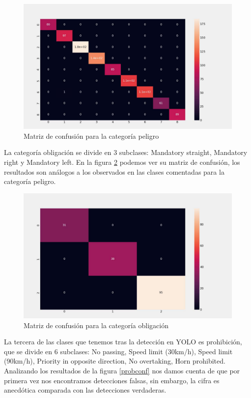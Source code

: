 \begin{figure}[H]
    \centering
 	\includegraphics[width=\textwidth]{Imagenes/IA/peligro_confusion.pdf}
    \caption{Matriz de confusión para la categoría peligro}
    \label{pelconf}
\end{figure}

La categoría obligación se divide en 3 subclases: Mandatory straight, Mandatory right y Mandatory left. En la figura \ref{obconf} podemos ver su matriz de confusión, los resultados son análogos a los observados en las clases comentadas para la categoría peligro.\\

\begin{figure}[H]
    \centering
 	\includegraphics[width=\textwidth]{Imagenes/IA/obligacion_confusion.pdf}
    \caption{Matriz de confusión para la categoría obligación}
    \label{obconf}
\end{figure}

La tercera de las clases que tenemos tras la detección en YOLO es prohibición, que se divide en 6 subclases: No passing, Speed limit (30km/h), Speed limit (90km/h), Priority in opposite direction, No overtaking, Horn prohibited. Analizando los resultados de la figura \ref{probconf} nos damos cuenta de que por primera vez nos encontramos detecciones falsas, sin embargo, la cifra es anecdótica comparada con las detecciones verdaderas.\\

